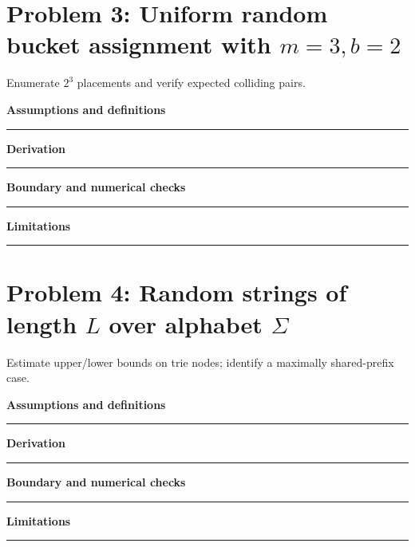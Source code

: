 \documentclass[11pt]{article}
\begin{document}
\section{\texorpdfstring{Problem 3: Uniform random bucket assignment with $m=3,b=2$}{Problem 3: Uniform bucket assignment with m=3 and b=2}}
Enumerate $2^3$ placements and verify expected colliding pairs.\par\medskip
\textbf{Assumptions and definitions}\par\vspace{0.7cm}\hrule\vspace{0.35cm}
\textbf{Derivation}\par\vspace{2.1cm}\hrule\vspace{0.3cm}
\textbf{Boundary and numerical checks}\par\vspace{1.1cm}\hrule\vspace{0.35cm}
\textbf{Limitations}\par\vspace{0.9cm}\hrule\vspace{0.35cm}
\section{\texorpdfstring{Problem 4: Random strings of length $L$ over alphabet $\Sigma$}{Problem 4: Random strings of length L over alphabet Sigma}}
Estimate upper/lower bounds on trie nodes; identify a maximally shared-prefix case.\par\medskip
\textbf{Assumptions and definitions}\par\vspace{0.7cm}\hrule\vspace{0.35cm}
\textbf{Derivation}\par\vspace{2.1cm}\hrule\vspace{0.3cm}
\textbf{Boundary and numerical checks}\par\vspace{1.1cm}\hrule\vspace{0.35cm}
\textbf{Limitations}\par\vspace{0.9cm}\hrule\vspace{0.35cm}
\end{document}
